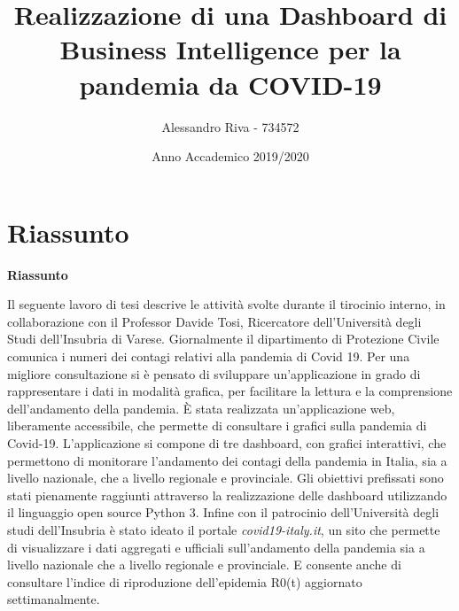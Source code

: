 \documentclass{article}
\title{Realizzazione di una Dashboard di Business Intelligence per la pandemia da COVID-19}
\author{Alessandro Riva - 734572}
\date{Anno Accademico 2019/2020}
\makeatletter
\renewcommand{\abstractname}{Riassunto}
\renewenvironment{abstract}{%
    \if@twocolumn
      \section*{\abstractname}%
    \else
      \begin{center}%
        {\bfseries \Large\abstractname\vspace{\z@}}
      \end{center}%
      \quotation
    \fi}
    {\if@twocolumn\else\endquotation\fi}
\makeatother
\begin{document}
\maketitle
\begin{abstract}
    \large
    \noindent Il seguente lavoro di tesi descrive le attività svolte durante il tirocinio interno, in collaborazione con il Professor Davide Tosi, Ricercatore dell’Università degli Studi dell’Insubria di Varese.
    Giornalmente il dipartimento di Protezione Civile comunica i numeri dei contagi relativi alla pandemia di Covid 19.
    Per una migliore consultazione si è pensato di sviluppare un’applicazione in grado di rappresentare i dati in modalità grafica, per facilitare la lettura e la comprensione dell’andamento della pandemia.
    È stata realizzata un’applicazione web, liberamente accessibile, che permette di consultare i grafici sulla pandemia di Covid-19.
    L’applicazione si compone di tre dashboard, con grafici interattivi, che permettono di monitorare l’andamento dei contagi della pandemia in Italia, sia a livello nazionale, che a livello regionale e provinciale.
    Gli obiettivi prefissati sono stati pienamente raggiunti attraverso la realizzazione delle dashboard utilizzando il linguaggio open source Python 3.
    Infine con il patrocinio dell’Università degli studi dell’Insubria è stato ideato il portale \emph{covid19-italy.it}, un sito che permette di visualizzare i dati aggregati e ufficiali sull’andamento della pandemia sia a livello nazionale che a livello regionale e provinciale. E consente anche di consultare l'indice di riproduzione dell'epidemia R0(t) aggiornato settimanalmente.
\end{abstract}
\end{document}
